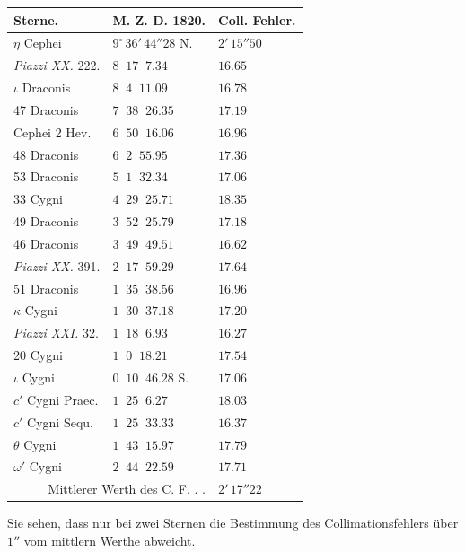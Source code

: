 \begin{center}
\begin{tabular}{l|l|l}
Sterne. & M. Z. D. 1820. & Coll. Fehler. \\
\hline
$\eta$ Cephei & $9^\circ\,36'\,44''28$ N. & $2'\,15''50$ \\
\emph{Piazzi XX.} 222. & $8\;\;17\;\;7.34$ & $16.65$ \\
$\iota$ Draconis & $8\;\;4\;\;11.09$ & $16.78$ \\
47 Draconis & $7\;\;38\;\;26.35$ & $17.19$ \\
Cephei 2 Hev. & $6\;\;50\;\;16.06$ & $16.96$ \\
48 Draconis & $6\;\;2\;\;55.95$ & $17.36$ \\
53 Draconis & $5\;\;1\;\;32.34$ & $17.06$ \\
33 Cygni & $4\;\;29\;\;25.71$ & $18.35$ \\
49 Draconis & $3\;\;52\;\;25.79$ & $17.18$ \\
46 Draconis & $3\;\;49\;\;49.51$ & $16.62$ \\
\emph{Piazzi XX.} 391. & $2\;\;17\;\;59.29$ & $17.64$ \\
51 Draconis & $1\;\;35\;\;38.56$ & $16.96$ \\
$\kappa$ Cygni & $1\;\;30\;\;37.18$ & $17.20$ \\
\emph{Piazzi XXI.} 32. & $1\;\;18\;\;6.93$ & $16.27$ \\
20 Cygni & $1\;\;0\;\;18.21$ & $17.54$ \\
$\iota$ Cygni & $0\;\;10\;\;46.28$ S. & $17.06$ \\
$c'$ Cygni Praec. & $1\;\;25\;\;6.27$ & $18.03$ \\
$c'$ Cygni Sequ. & $1\;\;25\;\;33.33$ & $16.37$ \\
$\theta$ Cygni & $1\;\;43\;\;15.97$ & $17.79$ \\
$\omega'$ Cygni & $2\;\;44\;\;22.59$ & $17.71$ \\
\multicolumn{2}{r|}{Mittlerer Werth des C. F. . .} & $2'\,17''22$ \\
\end{tabular}
\end{center}

Sie sehen, dass nur bei zwei Sternen die Bestimmung des Collimationsfehlers über $1''$
vom mittlern Werthe abweicht.
